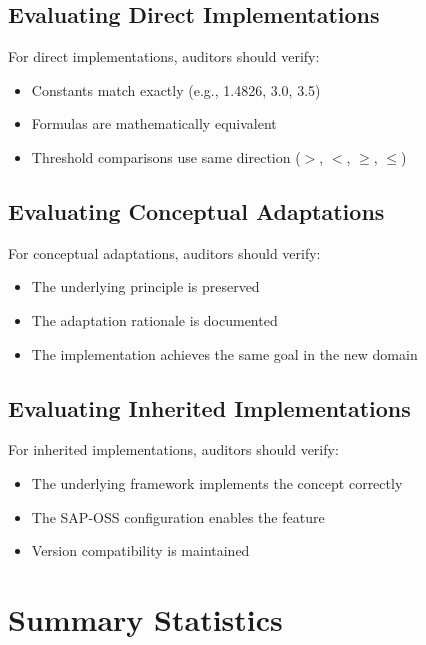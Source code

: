 \subsection{Evaluating Direct Implementations}

For direct implementations, auditors should verify:
\begin{itemize}[nosep]
    \item Constants match exactly (e.g., 1.4826, 3.0, 3.5)
    \item Formulas are mathematically equivalent
    \item Threshold comparisons use same direction ($>$, $<$, $\geq$, $\leq$)
\end{itemize}

\subsection{Evaluating Conceptual Adaptations}

For conceptual adaptations, auditors should verify:
\begin{itemize}[nosep]
    \item The underlying principle is preserved
    \item The adaptation rationale is documented
    \item The implementation achieves the same goal in the new domain
\end{itemize}

\subsection{Evaluating Inherited Implementations}

For inherited implementations, auditors should verify:
\begin{itemize}[nosep]
    \item The underlying framework implements the concept correctly
    \item The SAP-OSS configuration enables the feature
    \item Version compatibility is maintained
\end{itemize}

\section{Summary Statistics}

